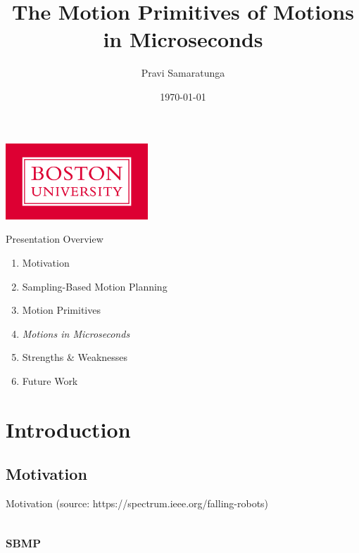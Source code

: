 \documentclass{beamer}
\title[]{The Motion Primitives of Motions in Microseconds}
\author[]{Pravi Samaratunga}
\institute{Boston University ECE}
\date{\today}
\begin{document}
\begin{frame}
   \begin{center}
       \titlepage
     
       \includegraphics[width=0.4\textwidth]{./assets/BU_logo.png}
   \end{center}
\end{frame}

\begin{frame}{Presentation Overview}
\begin{enumerate}
\item Motivation \\
\item Sampling-Based Motion Planning \\
\item Motion Primitives \\
\item \textit{Motions in Microseconds} \\
\item Strengths \& Weaknesses\\
\item Future Work \\
\end{enumerate}
\end{frame}

\section{Introduction}

\subsection{Motivation}
\begin{frame}{Motivation}
\centering
{}
(source: https://spectrum.ieee.org/falling-robots)
\end{frame}

\subsection{\textsc{sbmp}}
\end{document}
